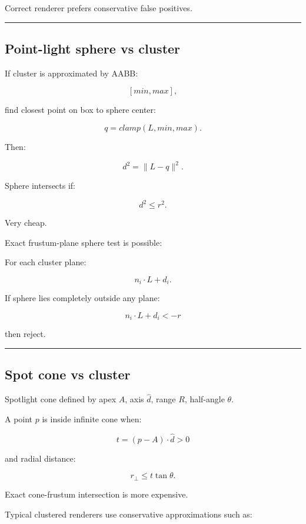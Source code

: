 Correct renderer prefers conservative false positives.

\begin{center}\rule{0.5\linewidth}{0.5pt}\end{center}

\subsection{Point-light sphere vs cluster}\label{04-visual-computing-ii-ch040-point-light-sphere-vs-cluster}

If cluster is approximated by AABB:

\[
[min,max],
\]

find closest point on box to sphere center:

\[
q=
clamp(
L,
min,
max
).
\]

Then:

\[
d^2=
\|L-q\|^2.
\]

Sphere intersects if:

\[
\boxed{
d^2\le r^2.
}
\]

Very cheap.

Exact frustum-plane sphere test is possible:

For each cluster plane:

\[
n_i\cdot L+d_i.
\]

If sphere lies completely outside any plane:

\[
n_i\cdot L+d_i<-r
\]

then reject.

\begin{center}\rule{0.5\linewidth}{0.5pt}\end{center}

\subsection{Spot cone vs cluster}\label{04-visual-computing-ii-ch040-spot-cone-vs-cluster}

Spotlight cone defined by apex \(A\), axis \(\hat d\), range \(R\), half-angle \(\theta\).

A point \(p\) is inside infinite cone when:

\[
t=
(p-A)\cdot\hat d>0
\]

and radial distance:

\[
r_\perp
\le
t\tan\theta.
\]

Exact cone-frustum intersection is more expensive.

Typical clustered renderers use conservative approximations such as:

